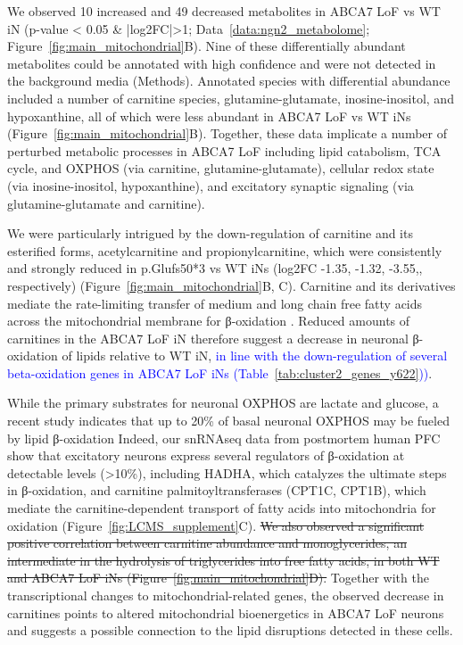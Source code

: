 We observed 10 increased and 49 decreased metabolites in ABCA7 LoF vs WT iN (p-value < 0.05 & |log2FC|>1; Data~\ref{data:ngn2_metabolome}; Figure~\ref{fig:main_mitochondrial}B). Nine of these differentially abundant metabolites could be annotated with high confidence and were not detected in the background media (Methods). Annotated species with differential abundance included a number of carnitine species, glutamine-glutamate, inosine-inositol, and hypoxanthine, all of which were less abundant in ABCA7 LoF vs WT iNs (Figure~\ref{fig:main_mitochondrial}B). Together, these data implicate a number of perturbed metabolic processes in ABCA7 LoF including lipid catabolism, TCA cycle, and OXPHOS (via carnitine\cite{Virmani2022-uc}, glutamine-glutamate\cite{Yoo2020-lh,noauthor_2023-sp}), cellular redox state (via inosine-inositol\cite{Chatree2020-qn,Basile2022-dd}, hypoxanthine\cite{Furuhashi2020-oi,Lee2018-tk}), and excitatory synaptic signaling (via glutamine-glutamate\cite{Morland2022-dk,noauthor_2021-cn,noauthor_2022-jz} and carnitine\cite{Inazu2008-wg,noauthor_2016-gp,Janiri1991-sx}). 

We were particularly intrigued by the down-regulation of carnitine and its esterified forms, acetylcarnitine and propionylcarnitine, which were consistently and strongly reduced in p.Glufs50*3 vs WT iNs  (log2FC -1.35, -1.32, -3.55,, respectively) (Figure~\ref{fig:main_mitochondrial}B, C). Carnitine and its derivatives mediate the rate-limiting transfer of medium and long chain free fatty acids across the mitochondrial membrane for β-oxidation \cite{noauthor_2016-la,noauthor_2004-tm}. Reduced amounts of carnitines in the ABCA7 LoF iN therefore suggest a decrease in neuronal β-oxidation of lipids relative to WT iN, \textcolor{blue}{in line with the down-regulation of several beta-oxidation genes in ABCA7 LoF iNs (Table~\ref{tab:cluster2_genes_y622}))}. 

While the primary substrates for neuronal OXPHOS are lactate and glucose\cite{Dienel2018-dt,Trigo2022-ym,Yellen2018-kr}, a recent study indicates that up to 20\% of basal neuronal OXPHOS may be fueled by lipid β-oxidation\cite{Morant-Ferrando2023-va} Indeed, our snRNAseq data from postmortem human PFC show that excitatory neurons express several regulators of β-oxidation at detectable levels (>10\%), including HADHA, which catalyzes the ultimate steps in β-oxidation, and carnitine palmitoyltransferases (CPT1C, CPT1B), which mediate the carnitine-dependent transport of fatty acids into mitochondria for oxidation (Figure~\ref{fig:LCMS_supplement}C). \sout{We also observed a significant positive correlation between carnitine abundance and monoglycerides, an intermediate in the hydrolysis of triglycerides into free fatty acids, in both WT and ABCA7 LoF iNs (Figure~\ref{fig:main_mitochondrial}D).} Together with the transcriptional changes to mitochondrial-related genes, the observed decrease in carnitines  points to altered mitochondrial bioenergetics in ABCA7 LoF neurons and suggests a possible connection to the lipid disruptions detected in these cells.

